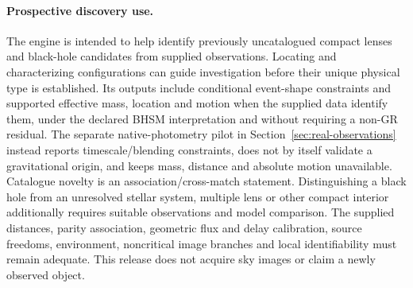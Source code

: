 \paragraph{Prospective discovery use.}
The engine is intended to help identify previously uncatalogued compact
lenses and black-hole candidates from supplied observations. Locating
and characterizing configurations can guide investigation before their
unique physical type is established. Its outputs include conditional
event-shape constraints and supported effective mass, location and motion when the
supplied data identify them, under the declared BHSM interpretation and
without requiring a non-GR residual. The separate native-photometry pilot
in Section~\ref{sec:real-observations} instead reports timescale/blending
constraints, does not by itself validate a gravitational origin, and
keeps mass, distance and absolute motion unavailable.
Catalogue novelty is an association/cross-match statement. Distinguishing
a black hole from an unresolved stellar system, multiple lens or other
compact interior additionally requires suitable observations and model
comparison. The supplied distances, parity association, geometric flux
and delay calibration, source freedoms, environment, noncritical image
branches and local identifiability must remain adequate. This release
does not acquire sky images or claim a newly observed object.
